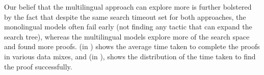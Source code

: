 \begin{table}[ht]
    \centering
    \caption{Comparison between the average number of nodes, edges, and degree of the proof trees generated on various \proofwala$\;$models over different data-mixes.}
    \label{tab:tree-stats}
\end{table}

Our belief that the multilingual approach can explore more is further bolstered by the fact that despite the same search timeout set for both approaches, the monolingual models often fail early (not finding any tactic that can expand the search tree), whereas the multilingual models explore more of the search space and found more proofs.  (in ) shows the average time taken to complete the proofs in various data mixes, and  (in ), shows the distribution of the time taken to find the proof successfully.

